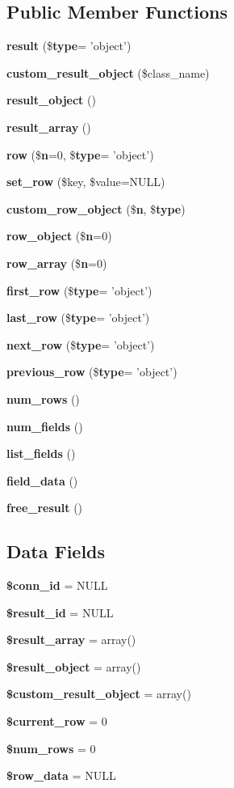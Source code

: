 \subsection*{Public Member Functions}
\begin{DoxyCompactItemize}
\item 
{\bf result} (\${\bf type}= 'object')
\item 
{\bf custom\-\_\-result\-\_\-object} (\$class\-\_\-name)
\item 
{\bf result\-\_\-object} ()
\item 
{\bf result\-\_\-array} ()
\item 
{\bf row} (\${\bf n}=0, \${\bf type}= 'object')
\item 
{\bf set\-\_\-row} (\$key, \$value=N\-U\-L\-L)
\item 
{\bf custom\-\_\-row\-\_\-object} (\${\bf n}, \${\bf type})
\item 
{\bf row\-\_\-object} (\${\bf n}=0)
\item 
{\bf row\-\_\-array} (\${\bf n}=0)
\item 
{\bf first\-\_\-row} (\${\bf type}= 'object')
\item 
{\bf last\-\_\-row} (\${\bf type}= 'object')
\item 
{\bf next\-\_\-row} (\${\bf type}= 'object')
\item 
{\bf previous\-\_\-row} (\${\bf type}= 'object')
\item 
{\bf num\-\_\-rows} ()
\item 
{\bf num\-\_\-fields} ()
\item 
{\bf list\-\_\-fields} ()
\item 
{\bf field\-\_\-data} ()
\item 
{\bf free\-\_\-result} ()
\end{DoxyCompactItemize}
\subsection*{Data Fields}
\begin{DoxyCompactItemize}
\item 
{\bf \$conn\-\_\-id} = N\-U\-L\-L
\item 
{\bf \$result\-\_\-id} = N\-U\-L\-L
\item 
{\bf \$result\-\_\-array} = array()
\item 
{\bf \$result\-\_\-object} = array()
\item 
{\bf \$custom\-\_\-result\-\_\-object} = array()
\item 
{\bf \$current\-\_\-row} = 0
\item 
{\bf \$num\-\_\-rows} = 0
\item 
{\bf \$row\-\_\-data} = N\-U\-L\-L
\end{DoxyCompactItemize}
